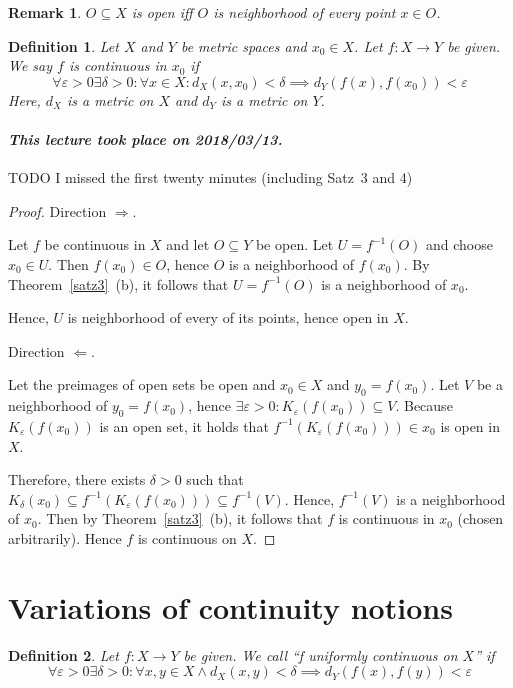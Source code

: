 \documentclass{article}
\newtheorem{definition}{Definition}  \numberwithin{definition}{section}
\newtheorem{remark}{Remark}  \numberwithin{remark}{section}
\newcommand{\dateref}[1]{\paragraph{\textit{This lecture took place on #1.}}}
\begin{document}
\begin{remark}
  $O \subseteq X$ is open iff $O$ is neighborhood of every point $x \in O$.
\end{remark}

\begin{definition}
  Let $X$ and $Y$ be metric spaces and $x_0 \in X$.
  Let $f: X \to Y$ be given. We say $f$ is continuous in $x_0$ if
  \[ \forall \varepsilon > 0 \exists \delta > 0: \forall x \in X: d_X(x, x_0) < \delta \implies d_Y(f(x), f(x_0)) < \varepsilon \]
  Here, $d_X$ is a metric on $X$ and $d_Y$ is a metric on $Y$.
\end{definition}

\dateref{2018/03/13}

TODO I missed the first twenty minutes (including Satz~3 and 4)

\begin{proof}
  Direction $\Rightarrow$.

  Let $f$ be continuous in $X$ and let $O \subseteq Y$ be open. Let $U = f^{-1}(O)$ and choose $x_0 \in U$. Then $f(x_0) \in O$, hence $O$ is a neighborhood of $f(x_0)$. By Theorem~\ref{satz3}~(b), it follows that $U = f^{-1}(O)$ is a neighborhood of $x_0$.

  Hence, $U$ is neighborhood of every of its points, hence open in $X$.

  Direction $\Leftarrow$.

  Let the preimages of open sets be open and $x_0 \in X$ and $y_0 = f(x_0)$.
  Let $V$ be a neighborhood of $y_0 = f(x_0)$, hence $\exists \varepsilon > 0: K_{\varepsilon}(f(x_0)) \subseteq V$. Because $K_{\varepsilon}(f(x_0))$ is an open set, it holds that $f^{-1}(K_{\varepsilon}(f(x_0))) \in x_0$ is open in $X$.

  Therefore, there exists $\delta > 0$ such that $K_{\delta}(x_0) \subseteq f^{-1}(K_{\varepsilon}(f(x_0))) \subseteq f^{-1}(V)$. Hence, $f^{-1}(V)$ is a neighborhood of $x_0$. Then by Theorem~\ref{satz3}~(b), it follows that $f$ is continuous in $x_0$ (chosen arbitrarily). Hence $f$ is continuous on $X$.
\end{proof}

\section{Variations of continuity notions}

\begin{definition} %
  Let $f: X \to Y$ be given.
  We call \enquote{f uniformly continuous on $X$} if
  \[
  	\forall \varepsilon > 0 \exists \delta > 0:
  	\forall x, y \in X \land d_X(x,y) < \delta \implies d_Y(f(x), f(y)) < \varepsilon
  \]
\end{definition}
\end{document}
